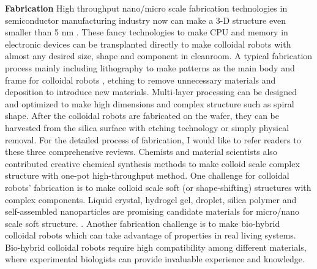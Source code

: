 \textbf{Fabrication}  High throughput nano/micro scale fabrication technologies in semiconductor manufacturing industry now can make a 3-D structure even smaller than 5 nm \autocite{mokhlesi2010three}. These fancy technologies to make CPU and memory in electronic devices can be transplanted directly to make colloidal robots with almost any desired size, shape and component in cleanroom\autocite{koman2018colloidal}. A typical fabrication process mainly including lithography to make patterns as the main body and frame for colloidal robots , etching to remove unnecessary materials and deposition to introduce new materials. Multi-layer processing can be designed and optimized to make high dimensions and complex structure such as spiral shape\autocite{zhang2009artificial}. After the colloidal robots are fabricated on the wafer, they can be harvested from the silica surface with etching technology or simply physical removal. For the detailed process of fabrication, I would like to refer readers to these three comprehensive reviews\autocite{wong2016synthetic,wang2017emerging, zha2018tubular}. Chemists and material scientists also contributed creative chemical synthesis methods to make colloid scale complex structure with one-pot high-throughput method\autocite{youssef2016shape,gong2017patchy,wang2019active}. One challenge for colloidal robots' fabrication is to   make  colloid scale soft (or shape-shifting) structures with complex components. Liquid crystal, hydrogel gel, droplet, silica polymer and self-assembled nanoparticles are promising candidate materials for micro/nano scale soft structure. \autocite{leong2009tetherless,denkov2015self,zhang2017printing,wei2019molecular}. Another fabrication challenge is to make bio-hybrid colloidal robots which can take advantage of  properties in real living systems. Bio-hybrid colloidal robots require high compatibility  among different materials, where experimental biologists can provide invaluable experience and knowledge\autocite{stanton2016biohybrid,magdanz2013development}.

